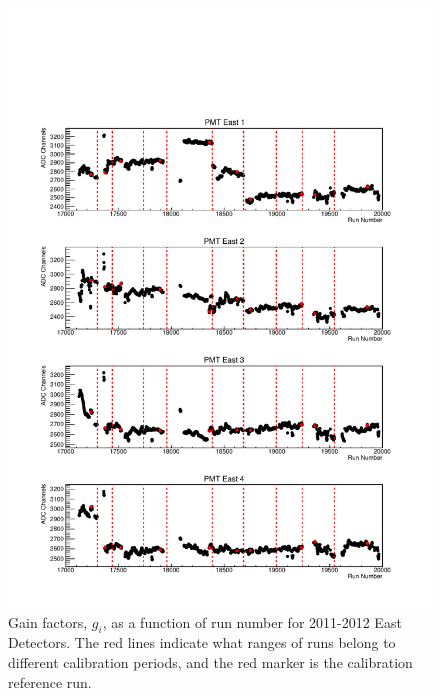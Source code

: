 \begin{figure}[p] 
  \centering
  \includegraphics[page=3,scale=.8]{3-UCNAAnalysis/2011-2012_gain.pdf}
  \caption{Gain factors, $g_i$, as a function of run number for 2011-2012 East Detectors.
    The red lines indicate what ranges of runs belong to
    different calibration periods, and the red marker is the calibration reference run.}
  \label{fig:2011-2012pulser_East}
\end{figure}

